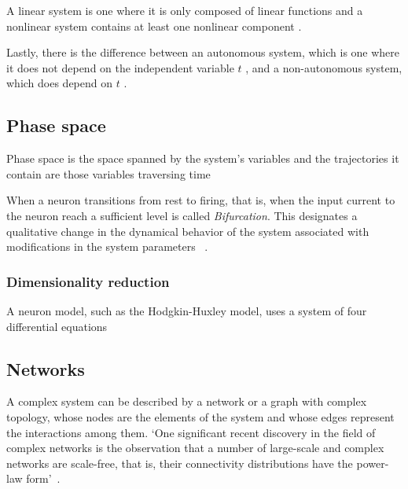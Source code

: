 \documentclass[../../Orator.tex]{subfiles}
\begin{document}
A linear system is one where it is only composed of linear functions and a nonlinear system contains at least one nonlinear component \cite{}.

Lastly, there is the difference between an autonomous system, which is one where it does not depend on the independent variable \(t\) \cite{}, and a non-autonomous system, which does depend on \(t\) \cite{}.


\begin{comment}
    \begin{split}\left[\begin{array}{ccll}
    {\displaystyle \frac{du}{dt}} &=& u\left(1-u^{2}\right)-w+I \equiv F(u,w)\\[.2cm]
    {\displaystyle \frac{dw}{dt}} &=& \varepsilon \left(u -0.5w+1\right) \equiv \varepsilon G(u,w)\, ,\\
    \end{array}\right.\end{split}
    [ref:https://neuronaldynamics-exercises.readthedocs.io/en/latest/exercises/brunel-network.html]
\end{comment}

\subsection{Phase space}
Phase space is the space spanned by the system's variables and the trajectories it contain are those variables traversing time

When a neuron transitions from rest to firing, that is, when the input current to the neuron reach a sufficient level is called \textit{Bifurcation}. This designates a qualitative change in the dynamical behavior of the system associated with modifications in the system parameters~\cite{STEFANESCU2012748} .




\subsubsection{Dimensionality reduction}
A neuron model, such as the Hodgkin-Huxley model, uses a system of four differential equations

\subsection*{Networks}
A complex system can be described by a network or a graph with complex topology, whose nodes are the elements of the system and whose edges represent the interactions among them. `One significant recent discovery in the field of complex networks is the observation that a number of large-scale and complex networks are scale-free, that is, their connectivity distributions have the
power-law form'~\cite{wang2002synchronization}.
\end{document}
